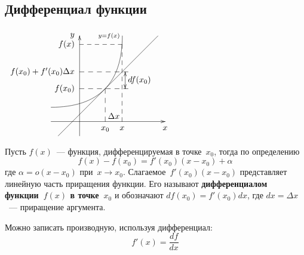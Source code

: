 \subsection{Дифференциал функции}
\begin{floatingfigure}[r]{72mm}
\noindent
$\begin{xy} /r12mm/:
(-1, 0); (3, 0) **@{-} *@{>} *++!U{x};
(0, -0.5); (0, 3) **@{-} *@{>} *++!R{y};
(-1, 0.5); (1.5, 3) **\crv{(1.5, 0.5)} *+!R{\scriptstyle y = f(x)};
(-0.75, -0.5); (2.75, 3) **@{-}; %
(0.9, 1.15) = "M"; (0.9, 0) **@{--} *++!U{x_0};
(1.7, 1.15); (0, 1.15) **@{--} *++!R{f(x_0)};
(1.49, 2.7) = "X"; (1.49, 0) **@{--} *++!U{x};
"X"; (0, 2.7) **@{--} *++!R{f(x)};
(1.2, 0.2) *{\Delta x};
(1.7, 1.74); (0, 1.74) **@{--} *++!R{f(x_0) + f'(x_0) \Delta x};
(1.6, 1.74); (1.6, 1.15) **{} *@{>}; %
(1.6, 1.74) **@{-} *@{>};
(2.1, 1.45) *{df(x_0)};
\end{xy}$
\end{floatingfigure}
  Пусть $f(x)$~--- функция, дифференцируемая в точке~$x_0$, тогда по определению
\begin{equation*}
f(x) - f(x_0) = f'(x_0)(x - x_0) + \alpha
\end{equation*}
где $\alpha = o(x - x_0)$ при~$x \to x_0$.
Слагаемое~$f'(x_0)(x - x_0)$ представляет линейную часть приращения функции.
Его называют \textbf{дифференциалом функции~$f(x)$ в точке~$x_0$} и обозначают $df(x_0) = f'(x_0)dx$, где $dx = \Delta x$~--- приращение аргумента.

Можно записать производную, используя дифференциал:
\begin{equation*}
f'(x) = \frac{df}{dx}
\end{equation*}
